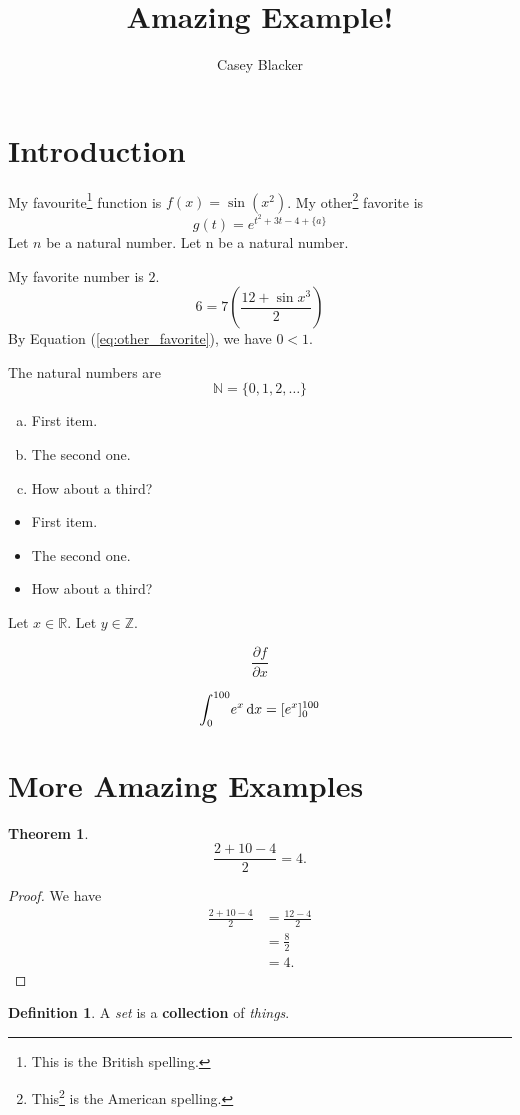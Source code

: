 \documentclass{article}
\title{Amazing Example!}
\author{Casey Blacker}
\date{}
\theoremstyle{plain}
\newtheorem*{thm}{Theorem}
\theoremstyle{definition}
\newtheorem{defi}{Definition}
\renewcommand{\b}[1]{\mathbb{#1}}
\begin{document}
\maketitle

\tableofcontents

\section{Introduction}
My favourite\footnote{This is the British spelling.} function is $f(x)=\sin(x^2)$. My other\footnote{This\footnote{test} is the American spelling.} favorite is
\[\tag{$\ast$}\label{eq:other_favorite}
    g(t) = e^{t^2+3t-4+\{a\}}
\]
Let $n$ be a natural number.\newline
Let n be a natural number.

\vspace{1cm}
\noindent
My favorite number is $2$.
\[
    6 = 7\left(\frac{12+\sin x^3}{2}\right)
\]
By Equation (\ref{eq:other_favorite}), we have $0<1$.

The natural numbers are
\[
    \b{N} = \{0,1,2,\ldots\}
\]

\begin{enumerate}[a)]
    \item First item.
    \item The second one.
    \item How about a third?
\end{enumerate}

\begin{itemize}
    \item First item.
    \item The second one.
    \item How about a third?
\end{itemize}

Let $x\in \mathbb{R}$. Let $y\in\b{Z}$.

\[
    \frac{\partial f}{\partial x}
\]

\[
    \int_0^{100}\! e^x \,\mathrm{d}x = \huge[e^x\huge]_0^{100}
\]


\section{More Amazing Examples}
\begin{thm}
\[
    \frac{2+10-4}{2} = 4.
\]
\end{thm}

\begin{proof}
    We have
\begin{align*}
    \frac{2+10-4}{2}
        &=  \frac{12-4}{2}      \\
        &=  \frac{8}{2}         \\
        &=  4.
\end{align*}
\end{proof}

\begin{defi}
    A \emph{set} is a \textbf{collection} of \textit{things}.
\end{defi}
\end{document}
